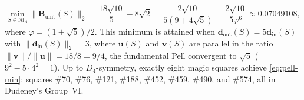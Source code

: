 \begin{theorem}
\begin{equation}
\label{eq:pell-min}
\min_{S\in\mathcal M_4} \|\mathbf B_{\mathrm{unit}}(S)\|_2
= \frac{18\sqrt{10}}{5} - 8\sqrt{2}
= \frac{2\sqrt{10}}{5(9+4\sqrt{5})}
= \frac{2\sqrt{10}}{5\varphi^6} \approx 0.07049108,
\end{equation}
where $\varphi=(1+\sqrt{5})/2$. This minimum is attained when $\mathbf d_{\mathrm{out}}(S)=5\mathbf d_{\mathrm{in}}(S)$ with $\|\mathbf d_{\mathrm{in}}(S)\|_2=3$, where $\mathbf u(S)$ and $\mathbf v(S)$ are parallel in the ratio $\|\mathbf v\|/\|\mathbf u\|=18/8=9/4$, the fundamental Pell convergent to $\sqrt{5}$ ($9^2-5\cdot4^2=1$). Up to $D_4$-symmetry, exactly eight magic squares achieve \eqref{eq:pell-min}: squares \#70, \#76, \#121, \#188, \#452, \#459, \#490, and \#574, all in Dudeney's Group~VI.
\end{theorem}

